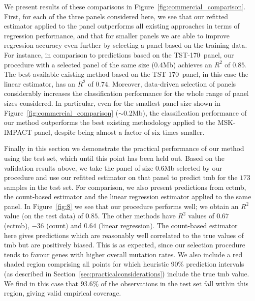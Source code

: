 \documentclass[12pt]{article}
\begin{document}
We present results of these comparisons in  Figure~\ref{fig:commercial_comparison}. First, for each of the three panels considered here, we see that our refitted estimator applied to the panel outperforms all existing approaches in terms of regression performance, and that for smaller panels we are able to improve regression accuracy even further by selecting a panel based on the training data. For instance, in comparison to predictions based on the TST-170~panel, our procedure with a selected panel of the same size ($0.4$Mb) achieves an $R^2$ of $0.85$. The best available existing method based on the TST-170~panel, in this case the linear estimator, has an $R^2$ of $0.74$. Moreover, data-driven selection of panels considerably increases the classification performance for the whole range of panel sizes considered. In particular, even for the smallest panel size shown in Figure~\ref{fig:commercial_comparison} ($\sim$0.2Mb), the classification performance of our method outperforms the best existing methodology applied to the MSK-IMPACT panel, despite being almost a factor of six times smaller.  

Finally in this section we demonstrate the practical performance of our method using the test set, which until this point has been held out. Based on the validation results above, we take the panel of size 0.6Mb selected by our procedure and use our refitted estimator on that panel to predict \gls{tmb} for the $173$  samples in the test set. For comparison, we also present predictions from \gls{ectmb}, the count-based estimator and the linear regression estimator applied to the same panel.  In Figure~\ref{fig:8} we see that our procedure performs well; we obtain an $R^2$ value (on the test data) of $0.85$.  The other methods have $R^2$ values of $0.67$ (\gls{ectmb}), $-36$ (count) and $0.64$ (linear regression). The count-based estimator here gives predictions which are reasonably well correlated to the true values of \gls{tmb} but are positively biased. This is as expected, since our selection procedure tends to favour genes with higher overall mutation rates.  We also include a red shaded region comprising all points for which heuristic 90\% prediction intervals (as described in Section~\ref{sec:practicalconsiderations}) include the true \gls{tmb} value. We find in this case that $93.6$\% of the observations in the test set fall within this region, giving valid empirical coverage.
\end{document}
